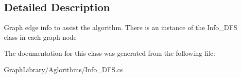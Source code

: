 \subsection{Detailed Description}
Graph edge info to assist the algorithm. There is an instance of the Info\+\_\+\+D\+F\+S class in each graph node 



The documentation for this class was generated from the following file\+:\begin{DoxyCompactItemize}
\item 
Graph\+Library/\+Aglorithms/Info\+\_\+\+D\+F\+S.\+cs\end{DoxyCompactItemize}
